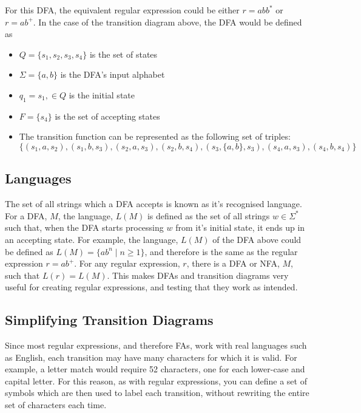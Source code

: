 For this DFA, the equivalent regular expression could be either $r = abb^*$ or $r = ab^+$. In the case of the transition
 diagram above, the DFA would be defined as
\begin{itemize}
  \item $Q = \{s_1, s_2, s_3, s_4\}$ is the set of states
  \item $\Sigma = \{a, b\}$ is the DFA's input alphabet
  \item $q_1 = s_1, \in Q$ is the initial state
  \item $F = \{s_4\}$ is the set of accepting states
  \item The transition function can be represented as the following set of triples:\\
  $\{(s_1, a, s_2), (s_1, b, s_3), (s_2, a, s_3), (s_2, b, s_4), (s_3, \{a, b\}, s_3), (s_4, a, s_3), (s_4, b, s_4)\}$
\end{itemize}

\subsection*{Languages}

The set of all strings which a DFA accepts is known as it's recognised language. For a DFA, $M$, the language, $L(M)$ is
 defined as the set of all strings $w \in \Sigma^*$ such that, when the DFA starts processing $w$ from it's initial
 state, it ends up in an accepting state. For example, the language, $L(M)$ of the DFA above could be defined as
 $L(M) = \{ab^n \mid n \geq 1\}$, and therefore is the same as the regular expression $r = ab^+$. For any regular
 expression, $r$, there is a DFA or NFA, $M$, such that $L(r) = L(M)$. This makes DFAs and transition diagrams very
 useful for creating regular expressions, and testing that they work as intended.

\subsection*{Simplifying Transition Diagrams}

Since most regular expressions, and therefore FAs, work with real languages such as English, each transition may have
 many characters for which it is valid. For example, a letter match would require 52 characters, one for each lower-case
 and capital letter. For this reason, as with regular expressions, you can define a set of symbols which are then used
 to label each transition, without rewriting the entire set of characters each time.

